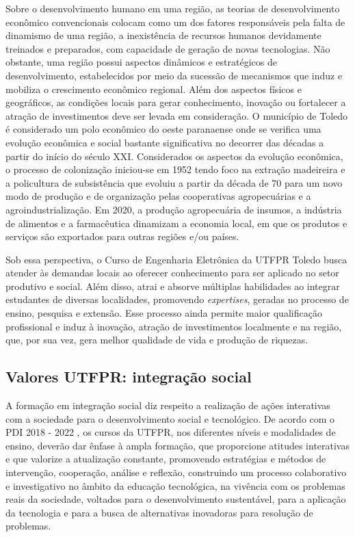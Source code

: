 
Sobre o desenvolvimento humano em uma região, as teorias de desenvolvimento econômico convencionais colocam como um dos fatores responsáveis pela falta de dinamismo de uma região, a inexistência de recursos humanos devidamente treinados e preparados, com capacidade de geração de novas tecnologias.  Não obstante, uma região possui aspectos dinâmicos e estratégicos de desenvolvimento, estabelecidos por meio da sucessão de mecanismos que induz e mobiliza o crescimento econômico regional. Além dos aspectos físicos e geográficos, as condições locais para gerar conhecimento, inovação ou fortalecer a atração de investimentos deve ser levada em consideração. O município de Toledo é considerado um polo econômico do oeste paranaense onde se verifica uma evolução econômica e social bastante significativa no decorrer das décadas a partir do início do século XXI. Considerados os aspectos da evolução econômica, o processo de colonização iniciou-se em 1952 tendo foco na extração madeireira e a policultura de subsistência que evoluiu a partir da década de 70 para um novo modo de produção e de organização pelas cooperativas agropecuárias e a agroindustrialização.  Em 2020, a produção agropecuária de insumos, a indústria de alimentos e a farmacêutica dinamizam a economia local, em que os produtos e serviços são exportados para outras regiões e/ou países. 

Sob essa perspectiva, o Curso de Engenharia Eletrônica da UTFPR Toledo busca atender às demandas locais ao oferecer conhecimento para ser aplicado no setor produtivo e social. Além disso, atrai e absorve múltiplas habilidades ao integrar estudantes de diversas localidades, promovendo \textit{expertises}, geradas no processo de ensino, pesquisa e extensão. Esse processo ainda permite maior qualificação profissional e induz à inovação, atração de investimentos localmente e na região, que, por sua vez, gera melhor qualidade de vida e produção de riquezas.

\subsection{Valores UTFPR: integração social}

A formação em integração social diz respeito a realização de ações interativas com a sociedade para o desenvolvimento social e tecnológico. De acordo com o PDI 2018 - 2022 \cite{pdiutfpr}, os cursos da UTFPR, nos diferentes níveis e modalidades de ensino, deverão dar ênfase à ampla formação, que proporcione atitudes interativas e que valorize a atualização constante, promovendo estratégias e métodos de intervenção, cooperação, análise e reflexão, construindo um processo colaborativo e investigativo no âmbito da educação tecnológica, na vivência com os problemas reais da sociedade, voltados para o desenvolvimento sustentável, para a aplicação da tecnologia e para a busca de alternativas inovadoras para resolução de problemas.

